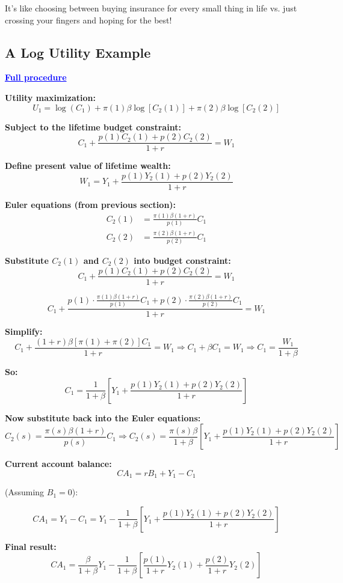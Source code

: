 \documentclass[12pt]{article}
\begin{document}
It’s like choosing between buying insurance for every small thing in life vs. just crossing your fingers and hoping for the best!

\subsection*{A Log Utility Example}

\textcolor{blue}{\textbf{\uline{Full procedure}}}

{\color{blue}
\textbf{Utility maximization:}
\[
U_1 = \log(C_1) + \pi(1)\beta \log[C_2(1)] + \pi(2)\beta \log[C_2(2)]
\]

\textbf{Subject to the lifetime budget constraint:}
\[
C_1 + \frac{p(1)C_2(1) + p(2)C_2(2)}{1 + r} = W_1
\]

\textbf{Define present value of lifetime wealth:}
\[
W_1 = Y_1 + \frac{p(1)Y_2(1) + p(2)Y_2(2)}{1 + r}
\]

\textbf{Euler equations (from previous section):}
\begin{align*}
C_2(1) &= \frac{\pi(1)\beta(1 + r)}{p(1)}C_1 \\
C_2(2) &= \frac{\pi(2)\beta(1 + r)}{p(2)}C_1
\end{align*}

\textbf{Substitute $C_2(1)$ and $C_2(2)$ into budget constraint:}
\[
C_1 + \frac{p(1)C_2(1) + p(2)C_2(2)}{1 + r} = W_1
\]

\[
C_1 + \frac{p(1) \cdot \frac{\pi(1)\beta(1 + r)}{p(1)}C_1 + p(2) \cdot \frac{\pi(2)\beta(1 + r)}{p(2)}C_1}{1 + r} = W_1
\]

\textbf{Simplify:}
\[
C_1 + \frac{(1 + r)\beta[\pi(1) + \pi(2)]C_1}{1 + r} = W_1
\Rightarrow C_1 + \beta C_1 = W_1
\Rightarrow C_1 = \frac{W_1}{1 + \beta}
\]

\textbf{So:}
\[
C_1 = \frac{1}{1 + \beta} \left[Y_1 + \frac{p(1)Y_2(1) + p(2)Y_2(2)}{1 + r} \right] \tag{11}
\]

\textbf{Now substitute back into the Euler equations:}
\[
C_2(s) = \frac{\pi(s)\beta(1 + r)}{p(s)}C_1
\Rightarrow
C_2(s) = \frac{\pi(s)\beta}{1 + \beta} \left[Y_1 + \frac{p(1)Y_2(1) + p(2)Y_2(2)}{1 + r} \right]
\]

\textbf{Current account balance:}
\[
CA_1 = rB_1 + Y_1 - C_1
\]

(Assuming \( B_1 = 0 \)):

\[
CA_1 = Y_1 - C_1 = Y_1 - \frac{1}{1 + \beta}\left[Y_1 + \frac{p(1)Y_2(1) + p(2)Y_2(2)}{1 + r} \right]
\]

\textbf{Final result:}
\[
CA_1 = \frac{\beta}{1 + \beta}Y_1 - \frac{1}{1 + \beta} \left[\frac{p(1)}{1 + r}Y_2(1) + \frac{p(2)}{1 + r}Y_2(2) \right] \tag{12}
\]

}
\end{document}
